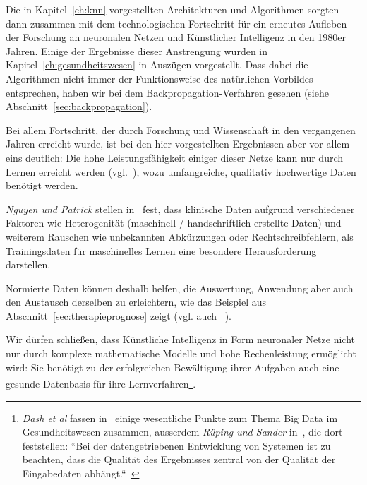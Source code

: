 Die in Kapitel~\ref{ch:knn} vorgestellten Architekturen und Algorithmen sorgten dann zusammen mit dem technologischen Fortschritt für ein erneutes Aufleben der Forschung an neuronalen Netzen und Künstlicher Intelligenz in den 1980er Jahren.
Einige der Ergebnisse dieser Anstrengung wurden in Kapitel~\ref{ch:gesundheitswesen} in Auszügen vorgestellt.
Dass dabei die Algorithmen nicht immer der Funktionsweise des natürlichen Vorbildes entsprechen, haben wir bei dem Backpropagation-Verfahren gesehen (siehe Abschnitt~\ref{sec:backpropagation}).

Bei allem Fortschritt, der durch Forschung und Wissenschaft in den vergangenen Jahren erreicht wurde, ist bei den hier vorgestellten Ergebnissen aber vor allem eins deutlich: Die hohe Leistungsfähigkeit einiger dieser Netze kann nur durch Lernen erreicht werden (vgl.~\cite[40]{AHR19}), wozu umfangreiche, qualitativ hochwertige Daten benötigt werden.

\textit{Nguyen und Patrick} stellen in~\cite{NP16} fest, dass klinische Daten aufgrund verschiedener Faktoren wie Heterogenität (maschinell / handschriftlich erstellte Daten) und weiterem Rauschen wie unbekannten Abkürzungen oder Rechtschreibfehlern, als Trainingsdaten für maschinelles Lernen eine besondere Herausforderung darstellen.

Normierte Daten können deshalb helfen, die Auswertung, Anwendung aber auch den Austausch derselben zu erleichtern, wie das Beispiel aus Abschnitt~\ref{sec:therapieprognose} zeigt (vgl. auch ~\cite[42]{AHR19}).

Wir dürfen schließen, dass Künstliche Intelligenz in Form neuronaler Netze nicht nur durch komplexe mathematische Modelle und hohe Rechenleistung ermöglicht wird: Sie benötigt zu der erfolgreichen Bewältigung ihrer Aufgaben auch eine gesunde Datenbasis für ihre Lernverfahren\footnote{
    \textit{Dash et al} fassen in~\cite{SSM+19} einige wesentliche Punkte zum Thema Big Data im Gesundheitswesen zusammen, ausserdem \textit{Rüping und Sander} in~\cite{RS19}, die dort feststellen: ``Bei der datengetriebenen Entwicklung von Systemen ist zu beachten, dass die Qualität des Ergebnisses zentral von der Qualität der Eingabedaten abhängt.``~\cite[19]{RS19}
}.













%
%
%
%

